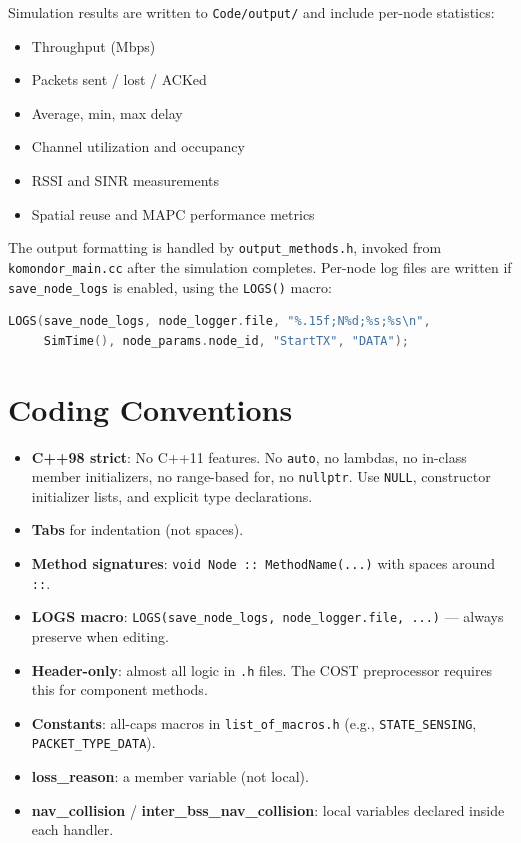 \documentclass[11pt,a4paper]{article}
\begin{document}
Simulation results are written to \texttt{Code/output/} and include per-node statistics:

\begin{itemize}[nosep]
  \item Throughput (Mbps)
  \item Packets sent / lost / ACKed
  \item Average, min, max delay
  \item Channel utilization and occupancy
  \item RSSI and SINR measurements
  \item Spatial reuse and MAPC performance metrics
\end{itemize}

The output formatting is handled by \texttt{output\_methods.h}, invoked from \texttt{komondor\_main.cc} after the simulation completes.  Per-node log files are written if \texttt{save\_node\_logs} is enabled, using the \texttt{LOGS()} macro:

\begin{lstlisting}[language=C++]
LOGS(save_node_logs, node_logger.file, "%.15f;N%d;%s;%s\n",
     SimTime(), node_params.node_id, "StartTX", "DATA");
\end{lstlisting}

\section{Coding Conventions}
\label{sec:conventions}

\begin{itemize}[nosep]
  \item \textbf{C++98 strict}: No C++11 features.  No \texttt{auto}, no lambdas, no in-class member initializers, no range-based for, no \texttt{nullptr}.  Use \texttt{NULL}, constructor initializer lists, and explicit type declarations.
  \item \textbf{Tabs} for indentation (not spaces).
  \item \textbf{Method signatures}: \texttt{void Node :: MethodName(...)} with spaces around \texttt{::}.
  \item \textbf{LOGS macro}: \texttt{LOGS(save\_node\_logs, node\_logger.file, ...)} --- always preserve when editing.
  \item \textbf{Header-only}: almost all logic in \texttt{.h} files.  The COST preprocessor requires this for component methods.
  \item \textbf{Constants}: all-caps macros in \texttt{list\_of\_macros.h} (e.g., \texttt{STATE\_SENSING}, \texttt{PACKET\_TYPE\_DATA}).
  \item \textbf{loss\_reason}: a member variable (not local).
  \item \textbf{nav\_collision} / \textbf{inter\_bss\_nav\_collision}: local variables declared inside each handler.
\end{itemize}
\end{document}
